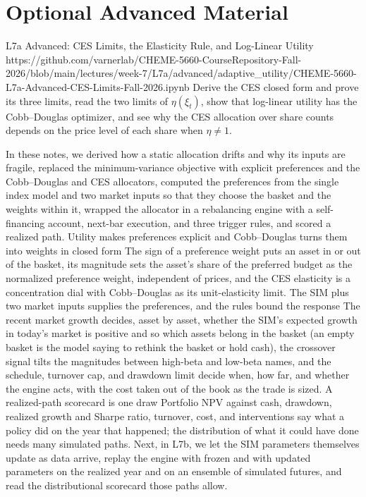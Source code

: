 \documentclass[11pt]{article}
\begin{document}
\section*{Optional Advanced Material}

\notebooklink
  {L7a Advanced: CES Limits, the Elasticity Rule, and Log-Linear Utility}
  {https://github.com/varnerlab/CHEME-5660-CourseRepository-Fall-2026/blob/main/lectures/week-7/L7a/advanced/adaptive_utility/CHEME-5660-L7a-Advanced-CES-Limits-Fall-2026.ipynb}
  {Derive the CES closed form  and prove its three limits, read the two limits of $\eta(\xi_t)$, show that log-linear utility has the Cobb--Douglas optimizer, and see why the CES allocation over share counts depends on the price level of each share when $\eta\ne1$.}

\newpage
\thispagestyle{fancy}
\keytakeaways
  {In these notes, we derived how a static allocation drifts and why its inputs are fragile, replaced the minimum-variance objective with explicit preferences and the Cobb--Douglas and CES allocators, computed the preferences from the single index model and two market inputs so that they choose the basket and the weights within it, wrapped the allocator in a rebalancing engine with a self-financing account, next-bar execution, and three trigger rules, and scored a realized path.}
  {Utility makes preferences explicit and Cobb--Douglas turns them into weights in closed form}
  {The sign of a preference weight puts an asset in or out of the basket, its magnitude sets the asset's share of the preferred budget as the normalized preference weight, independent of prices, and the CES elasticity is a concentration dial with Cobb--Douglas as its unit-elasticity limit.}
  {The SIM plus two market inputs supplies the preferences, and the rules bound the response}
  {The recent market growth decides, asset by asset, whether the SIM's expected growth in today's market is positive and so which assets belong in the basket (an empty basket is the model saying to rethink the basket or hold cash), the crossover signal tilts the magnitudes between high-beta and low-beta names, and the schedule, turnover cap, and drawdown limit decide when, how far, and whether the engine acts, with the cost taken out of the book as the trade is sized.}
  {A realized-path scorecard is one draw}
  {Portfolio NPV against cash, drawdown, realized growth and Sharpe ratio, turnover, cost, and interventions say what a policy did on the year that happened; the distribution of what it could have done needs many simulated paths.}
  {Next, in L7b, we let the SIM parameters themselves update as data arrive, replay the engine with frozen and with updated parameters on the realized year and on an ensemble of simulated futures, and read the distributional scorecard those paths allow.}
\end{document}
